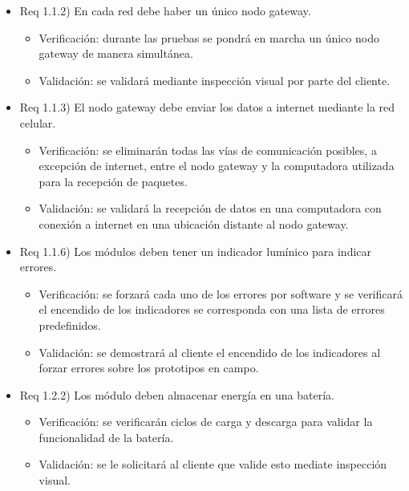 \documentclass[
11pt, %
codirector, %
]{charter}
\begin{document}
\begin{itemize} 

\item Req 1.1.2) En cada red debe haber un único nodo gateway.

\begin{itemize}
	\item Verificación: durante las pruebas se pondrá en marcha un único nodo gateway de manera simultánea.
	\item Validación: se validará mediante inspección visual por parte del cliente.
\end{itemize}


\item Req 1.1.3) El nodo gateway debe enviar los datos a internet mediante la red celular.

\begin{itemize}
	\item Verificación: se eliminarán todas las vías de comunicación posibles, a excepción de internet, entre el nodo gateway y la computadora utilizada para la recepción de paquetes.
	\item Validación: se validará la recepción de datos en una computadora con conexión a internet en una ubicación distante al nodo gateway.
\end{itemize}

\item Req 1.1.6) Los módulos deben tener un indicador lumínico para indicar errores.

\begin{itemize}
	\item Verificación: se forzará cada uno de los errores por software y se verificará el encendido de los indicadores se corresponda con una lista de errores predefinidos.
	\item Validación: se demostrará al cliente el encendido de los indicadores al forzar errores sobre los prototipos en campo.
\end{itemize}

\item Req 1.2.2) Los módulo deben almacenar energía en una batería.

\begin{itemize}
	\item Verificación: se verificarán ciclos de carga y descarga para validar la funcionalidad de la batería.
	\item Validación: se le solicitará al cliente que valide esto mediate inspección visual.
\end{itemize}


\end{itemize}
\end{document}
